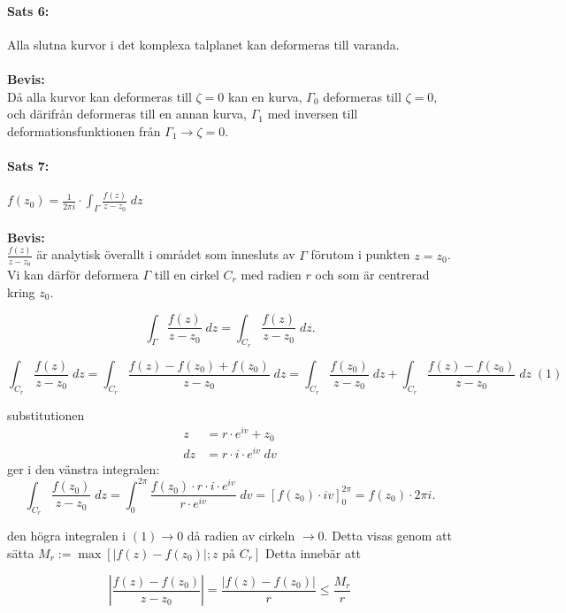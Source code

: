 \documentclass{article}%
\begin{document}
\paragraph{Sats 6:} Alla slutna kurvor i det komplexa talplanet kan deformeras till varanda.\\
\\
{\bf Bevis:}\\
Då alla kurvor kan deformeras till $\zeta = 0$ kan en kurva, $\Gamma_0$ deformeras till $\zeta = 0$, och därifrån deformeras 
till en annan kurva, $\Gamma_1$ med inversen till deformationsfunktionen från $\Gamma_1 \to \zeta = 0$.\\

\paragraph{Sats 7:} $f(z_0) = \frac 1 {2\pi i} \cdot \int_\Gamma \frac {f(z)} {z - z_0} \; dz$ \\
\\
{\bf Bevis:}\\
$\frac {f(z)} {z - z_0}$ är analytisk överallt i området som innesluts av $\Gamma$ förutom i punkten
$z = z_0$. Vi kan därför deformera $\Gamma$ till en cirkel $C_r$ med radien $r$ och 
som är centrerad kring $z_0$.

\[ \int_\Gamma \frac {f(z)} {z - z_0} \; dz = \int_{C_r} \frac {f(z)} {z - z_0} \; dz. \]

\[ \int_{C_r} \frac {f(z)} {z - z_0} \; dz = \int_{C_r} \frac {f(z) - f(z_0) + f(z_0)} {z - z_0} \; dz =
	\int_{C_r} \frac {f(z_0)} {z - z_0} \; dz + \int_{C_r} \frac {f(z) - f(z_0)} {z - z_0} \; dz \;(1) \]

substitutionen 
\begin{align*}
	z  &= r \cdot e^{iv} + z_0 \\
	dz &= r \cdot i \cdot e^{iv} \; dv
\end{align*}
ger i den vänstra integralen:
\[ \int_{C_r} \frac {f(z_0)} {z - z_0} \; dz = \int_0^{2\pi} \frac {f(z_0) \cdot r \cdot i \cdot e^{iv} } { r \cdot e^{iv}} \; dv =
	\left [f(z_0) \cdot iv \right ]_0^{2\pi} = f(z_0) \cdot 2 \pi i. \]

den högra integralen i $(1) \rightarrow 0$ då radien av cirkeln $\rightarrow 0$.
Detta visas genom att sätta $M_r := \operatorname{max} [|f(z) - f(z_0)|; z \text{ på } C_r]$
Detta innebär att

\[
	\left | \frac {f(z) - f(z_0)} {z - z_0} \right | = \frac {|f(z) - f(z_0)|} {r} \leq \frac {M_r} {r}
\]
\end{document}
